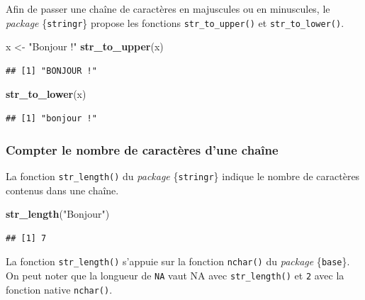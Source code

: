 \documentclass[
  11pt,
]{book}
\newenvironment{Shaded}{\begin{snugshade}}{\end{snugshade}}
\newcommand{\KeywordTok}[1]{\textcolor[rgb]{0.13,0.29,0.53}{\textbf{#1}}}
\newcommand{\NormalTok}[1]{#1}
\newcommand{\StringTok}[1]{\textcolor[rgb]{0.31,0.60,0.02}{#1}}
\numberwithin{equation}{section}
\numberwithin{countremarque}{section}
\begin{document}
Afin de passer une chaîne de caractères en majuscules ou en minuscules, le \emph{package} \{\texttt{stringr}\} propose les fonctions \texttt{str\_to\_upper()} et \texttt{str\_to\_lower()}.

\begin{Shaded}
\begin{Highlighting}[]
\NormalTok{x \textless{}{-}}\StringTok{ "Bonjour !"}
\KeywordTok{str\_to\_upper}\NormalTok{(x)}
\end{Highlighting}
\end{Shaded}

\begin{lstlisting}
## [1] "BONJOUR !"
\end{lstlisting}

\begin{Shaded}
\begin{Highlighting}[]
\KeywordTok{str\_to\_lower}\NormalTok{(x)}
\end{Highlighting}
\end{Shaded}

\begin{lstlisting}
## [1] "bonjour !"
\end{lstlisting}

\hypertarget{compter-le-nombre-de-caractuxe8res-dune-chauxeene}{%
\subsubsection{Compter le nombre de caractères d'une chaîne}\label{compter-le-nombre-de-caractuxe8res-dune-chauxeene}}

La fonction \texttt{str\_length()} du \emph{package} \{\texttt{stringr}\} indique le nombre de caractères contenus dans une chaîne.

\begin{Shaded}
\begin{Highlighting}[]
\KeywordTok{str\_length}\NormalTok{(}\StringTok{"Bonjour"}\NormalTok{)}
\end{Highlighting}
\end{Shaded}

\begin{lstlisting}
## [1] 7
\end{lstlisting}

La fonction \texttt{str\_length()} s'appuie sur la fonction \texttt{nchar()} du \emph{package} \{\texttt{base}\}. On peut noter que la longueur de \texttt{NA} vaut NA avec \texttt{str\_length()} et \texttt{2} avec la fonction native \texttt{nchar()}.
\end{document}
